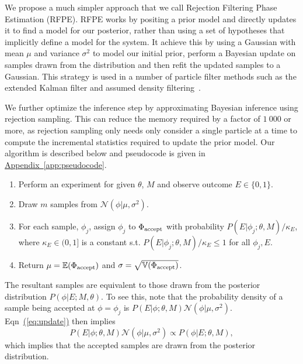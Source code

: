 \documentclass[aps,pra,amsmath,twocolumn,amssymb,superscriptaddress]{revtex4-1}
\newcommand{\eq}[1]{\hyperref[eq:#1]{(\ref*{eq:#1})}}
\newcommand{\app}[1]{\hyperref[app:#1]{Appendix~\ref*{app:#1}}}
\begin{document}
We propose a much simpler approach that we call Rejection Filtering Phase
Estimation (RFPE). RFPE works by positing a prior model and directly updates it
to find a model for our posterior, rather than using a set of hypotheses that implicitly
define a model for the system.  It achieve this by using a
Gaussian with mean $\mu$ and variance $\sigma^2$ to model our initial prior, perform a Bayesian update on samples
drawn from the distribution and then refit the updated samples to a Gaussian.
This strategy is used in a number of particle filter methods such as the extended Kalman filter and assumed density
filtering~\cite{haykin2004kalman,opper1998bayesian}.  

We further optimize
the inference step by approximating Bayesian inference using rejection
sampling.  This can reduce the memory required by a factor of $1~000$ or more,
as rejection sampling only needs only consider a single particle at a time to compute the incremental statistics required
to update the prior model. Our algorithm is described
below and pseudocode is given in \app{pseudocode}.





\begin{enumerate}
\item Perform an experiment for given $\theta$, $M$ and observe outcome $E\in \{0,1\}$.
\item Draw $m$ samples from $\mathcal{N}(\phi|\mu,\sigma^2)$.
\item For each sample, $\phi_j$, assign $\phi_j$ to $\Phi_{\rm accept}$ with probability $P(E|\phi_j;\theta,M)/\kappa_E$, where $\kappa_E\in (0,1]$ is a constant s.t. $P(E|\phi_j;\theta,M)/\kappa_E\le 1$ for all $\phi_j,E$.
\item Return $\mu = \mathbb{E}(\Phi_{\rm accept})$ and $\sigma =\sqrt{\mathbb{V}(\Phi_{\rm accept})}$.
\end{enumerate}

The resultant samples are equivalent to those drawn from the posterior distribution
$P(\phi|E;M,\theta)$.  To see this, note that the probability density of a sample being accepted at $\phi=\phi_j$ is $ P(E | \phi; \theta, M) \mathcal{N}(\phi|\mu,\sigma^2)$.  Eqn~\eq{update} then implies 
\begin{equation}
    P(E | \phi; \theta, M) \mathcal{N}(\phi|\mu,\sigma^2) \propto P(\phi | E; \theta, M),
\end{equation}
which implies that the accepted samples are drawn from the posterior distribution.  
\end{document}
